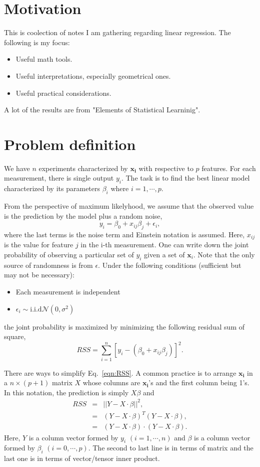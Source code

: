 \section{Motivation}
This is coolection of notes I am gathering regarding linear regression. The following is my focus:
\begin{itemize}
\item Useful math tools.
\item Useful interpretations, especially geometrical ones.
\item Useful practical considerations.
\end{itemize}
A lot of the results are from "Elements of Statistical Learninig".

\section{Problem definition}
We have $n$ experiments characterized by $\mathbf{x_{i}}$ with respective to $p$ features. For each measurement, there is single
output $y_i$. The task is to find the best linear model characterized by its parameters $\beta_i$ where $i=1,\cdots,p$.

From the perspective of maximum likelyhood, we assume that the observed value is the prediction by the model plus a random noise,
\begin{equation}
y_i = \beta_0 + x_{ij}\beta_j + \epsilon_i,\label{eqn:linear_startingpoint}
\end{equation} 
where the last terms is the noise term and Einstein notation is assumed. Here, $x_{ij}$ is the value for feature $j$ in the i-th measurement. One can write down
the joint probability of observing a particular set of $y_i$ given a set of $\mathbf{x}_i$. Note that the only source of randomness is from $\epsilon$. Under the 
following conditions (sufficient but may not be necessary):
\begin{itemize}
\item Each measurement is independent
\item $\epsilon_i\sim\mathrm{i.i.d}\mathcal N(0, \sigma^2)$
\end{itemize}
the joint probability is maximized by minimizing the following residual sum of square,
\begin{equation}
RSS = \sum_{i=1}^{n} \left[y_i -( \beta_0 + x_{ij}\beta_j)\right]^2.\label{eqn:RSS}
\end{equation}

There are ways to simplify Eq.~\ref{eqn:RSS}. A common practice is to arrange $\mathbf{x_{i}}$ in a $n\times (p+1)$ matrix $X$ whose columns are $\mathbf{x_i}$'s and
the first column being 1's. In this notation, the prediction is simply $X\beta$ and
\begin{eqnarray}
RSS &=& ||Y-X\cdot\beta||^2,\\
    &=& (Y-X\cdot\beta)^T(Y-X\cdot\beta),\\
    &=& (Y-X\cdot\beta)\cdot(Y-X\cdot\beta).
\end{eqnarray}
Here, $Y$ is a column vector formed by $y_i$ $(i = 1,\cdots,n)$ and $\beta$ is a column vector formed by $\beta_i$ $(i=0, \cdots, p)$. The second to last line is in terms of
matrix and the last one is in terms of vector/tensor inner product.

